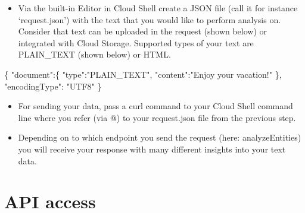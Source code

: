 \documentclass[
]{book}
\newenvironment{Shaded}{\begin{snugshade}}{\end{snugshade}}
\newcommand{\NormalTok}[1]{#1}
\newcommand{\SpecialCharTok}[1]{\textcolor[rgb]{0.00,0.00,0.00}{#1}}
\newcommand{\StringTok}[1]{\textcolor[rgb]{0.31,0.60,0.02}{#1}}
\providecommand{\tightlist}{%
  \setlength{\itemsep}{0pt}\setlength{\parskip}{0pt}}
\begin{document}
\begin{itemize}
\tightlist
\item
  Via the built-in Editor in Cloud Shell create a JSON file (call it for instance `request.json') with the text that you would like to perform analysis on. Consider that text can be uploaded in the request (shown below) or integrated with Cloud Storage. Supported types of your text are PLAIN\_TEXT (shown below) or HTML.
\end{itemize}

\begin{Shaded}
\begin{Highlighting}[]
\NormalTok{\{}
  \StringTok{"document"}\SpecialCharTok{:}\NormalTok{\{}
    \StringTok{"type"}\SpecialCharTok{:}\StringTok{"PLAIN\_TEXT"}\NormalTok{,}
    \StringTok{"content"}\SpecialCharTok{:}\StringTok{"Enjoy your vacation!"}
\NormalTok{  \},}
  \StringTok{"encodingType"}\SpecialCharTok{:} \StringTok{"UTF8"}
\NormalTok{\}}
\end{Highlighting}
\end{Shaded}

\begin{itemize}
\tightlist
\item
  For sending your data, pass a curl command to your Cloud Shell command line where you refer (via @) to your request.json file from the previous step.
\end{itemize}

\begin{Shaded}
\end{Shaded}

\begin{itemize}
\tightlist
\item
  Depending on to which endpoint you send the request (here: analyzeEntities) you will receive your response with many different insights into your text data.
\end{itemize}

\hypertarget{api-access}{%
\section{API access}\label{api-access}}
\end{document}
